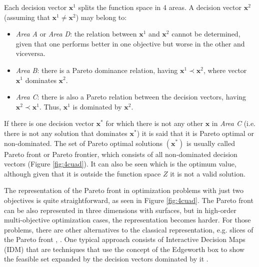     Each decision vector $\bm{x}^1$ splits the function space in 4 areas. A decision vector $\bm{x}^2$ (assuming that $\bm{x}^1 \neq \bm{x}^2$) may belong to:
    \begin{itemize}
        \item \textit{Area A} or \textit{Area D}: the relation between $\bm{x}^1$ and $\bm{x}^2$ cannot be determined, given that one performs better in one objective but worse in the other and viceversa.
        \item \textit{Area B}: there is a Pareto dominance relation, having $\bm{x}^1 \prec \bm{x}^2$, where vector $\bm{x}^1$ dominates $\bm{x}^2$.
        \item \textit{Area C}: there is also a Pareto relation between the decision vectors, having $\bm{x}^2 \prec \bm{x}^1$. Thus, $\bm{x}^1$ is dominated by $\bm{x}^2$.
    \end{itemize}
    
    \newpage
    
    If there is one decision vector $\bm{x}^*$ for which there is not any other $\bm{x}$ in \textit{Area C} (i.e. there is not any solution that dominates $\bm{x}^*$) it is said that it is Pareto optimal or non-dominated. The set of Pareto optimal solutions $(\bm{x}^*)$ is usually called Pareto front or Pareto frontier, which consists of all non-dominated decision vectors (Figure \ref{fig:4cuad}). It can also be seen which is the  optimum value, although given that it is outside the function space $Z$ it is not a valid solution.
    
    The representation of the Pareto front in optimization problems with just two objectives is quite straightforward, as seen in Figure \ref{fig:4cuad}. The Pareto front can be also represented in three dimensions with surfaces, but in high-order multi-objective optimization cases, the representation becomes harder. For those problems, there are other alternatives to the classical representation, e.g. slices of the Pareto front \cite{jaini2017fuzzy}, \cite{triantaphyllou2000multi}. One typical approach consists of Interactive Decision Maps (IDM) that are techniques that use the concept of the Edgeworth box to show the feasible set expanded by the decision vectors dominated by it \cite{lotov2013interactive}.
    
